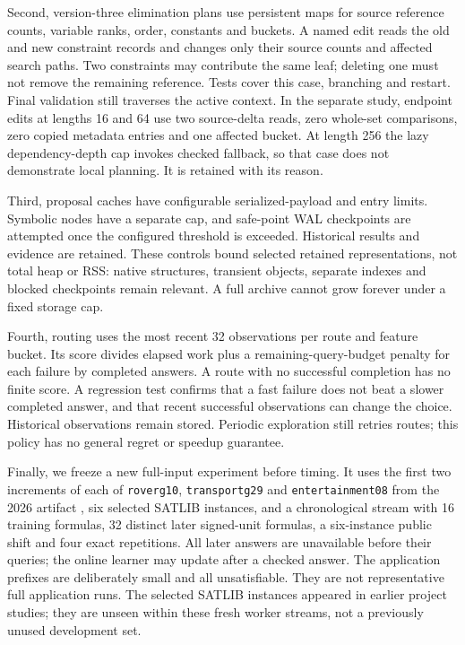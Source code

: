 \documentclass[11pt,a4paper]{article}
\numberwithin{equation}{section}
\theoremstyle{plain}
\theoremstyle{definition}
\theoremstyle{remark}
\begin{document}
Second, version-three elimination plans use persistent maps for source reference counts, variable ranks, order, constants and buckets. A named edit reads the old and new constraint records and changes only their source counts and affected search paths. Two constraints may contribute the same leaf; deleting one must not remove the remaining reference. Tests cover this case, branching and restart. Final validation still traverses the active context. In the separate study, endpoint edits at lengths 16 and 64 use two source-delta reads, zero whole-set comparisons, zero copied metadata entries and one affected bucket. At length 256 the lazy dependency-depth cap invokes checked fallback, so that case does not demonstrate local planning. It is retained with its reason.

Third, proposal caches have configurable serialized-payload and entry limits. Symbolic nodes have a separate cap, and safe-point WAL checkpoints are attempted once the configured threshold is exceeded. Historical results and evidence are retained. These controls bound selected retained representations, not total heap or RSS: native structures, transient objects, separate indexes and blocked checkpoints remain relevant. A full archive cannot grow forever under a fixed storage cap.

Fourth, routing uses the most recent 32 observations per route and feature bucket. Its score divides elapsed work plus a remaining-query-budget penalty for each failure by completed answers. A route with no successful completion has no finite score. A regression test confirms that a fast failure does not beat a slower completed answer, and that recent successful observations can change the choice. Historical observations remain stored. Periodic exploration still retries routes; this policy has no general regret or speedup guarantee.

Finally, we freeze a new full-input experiment before timing. It uses the first two increments of each of \texttt{roverg10}, \texttt{transportg29} and \texttt{entertainment08} from the 2026 artifact \citep{schreiber2026realtime}, six selected SATLIB instances, and a chronological stream with 16 training formulas, 32 distinct later signed-unit formulas, a six-instance public shift and four exact repetitions. All later answers are unavailable before their queries; the online learner may update after a checked answer. The application prefixes are deliberately small and all unsatisfiable. They are not representative full application runs. The selected SATLIB instances appeared in earlier project studies; they are unseen within these fresh worker streams, not a previously unused development set.
\end{document}

